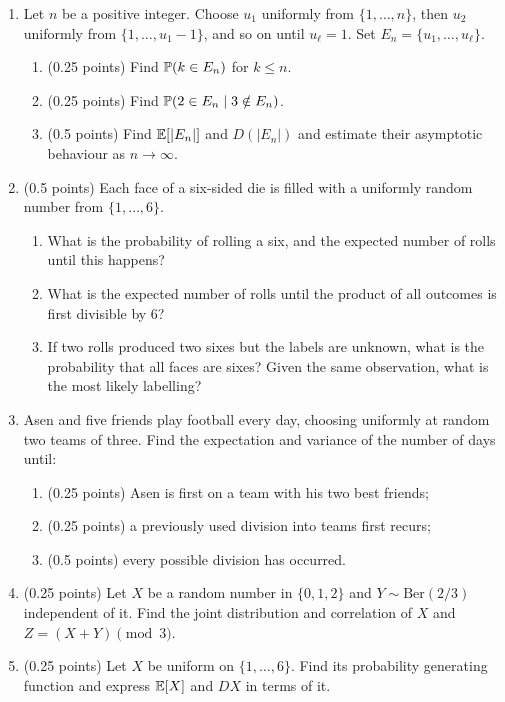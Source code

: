 \documentclass[a4paper]{report}
\begin{document}
\begin{problem}
\begin{enumerate}
\item Let $n$ be a positive integer. Choose $u_1$ uniformly from $\{1,\ldots,n\}$, then $u_2$ uniformly from $\{1,\ldots,u_1-1\}$, and so on until $u_\ell=1$. Set $E_n=\{u_1,\ldots,u_\ell\}$.
\begin{enumerate}
\item (0.25 points) Find $\P(k\in E_n)$ for $k\leq n$.
\item (0.25 points) Find $\P(2\in E_n\mid3\notin E_n)$.
\item (0.5 points) Find $\E[|E_n|]$ and $D(|E_n|)$ and estimate their asymptotic behaviour as $n\to\infty$.
\end{enumerate}
\item (0.5 points) Each face of a six-sided die is filled with a uniformly random number from $\{1,\ldots,6\}$.
\begin{enumerate}
\item What is the probability of rolling a six, and the expected number of rolls until this happens?
\item What is the expected number of rolls until the product of all outcomes is first divisible by 6?
\item If two rolls produced two sixes but the labels are unknown, what is the probability that all faces are sixes? Given the same observation, what is the most likely labelling?
\end{enumerate}
\item Asen and five friends play football every day, choosing uniformly at random two teams of three. Find the expectation and variance of the number of days until:
\begin{enumerate}
\item (0.25 points) Asen is first on a team with his two best friends;
\item (0.25 points) a previously used division into teams first recurs;
\item (0.5 points) every possible division has occurred.
\end{enumerate}
\item (0.25 points) Let $X$ be a random number in $\{0,1,2\}$ and $Y\sim\mathrm{Ber}(2/3)$ independent of it. Find the joint distribution and correlation of $X$ and $Z=(X+Y)\pmod3$.
\item (0.25 points) Let $X$ be uniform on $\{1,\ldots,6\}$. Find its probability generating function and express $\E[X]$ and $DX$ in terms of it.

\end{enumerate}
\end{problem}
\end{document}
